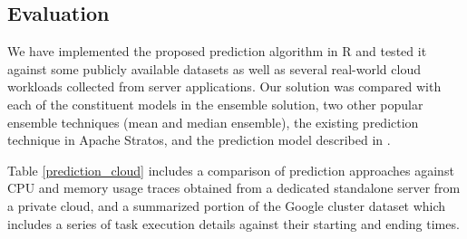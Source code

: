 \subsection{Evaluation}

We have implemented the proposed prediction algorithm in R and tested it against some publicly available datasets as well as several real-world cloud workloads \cite{AutoscaleAnalyser} collected from server applications. Our solution was compared with each of the constituent models in the ensemble solution, two other popular ensemble techniques (mean and median ensemble), the existing prediction technique in Apache Stratos, and the prediction model described in \cite{Roy_2011}.

Table \ref{prediction_cloud} includes a comparison of prediction approaches against CPU and memory usage traces obtained from a dedicated standalone server from a private cloud, and a summarized portion of the Google cluster dataset \cite{GoogleClusterData} which includes a series of task execution details against their starting and ending times.

